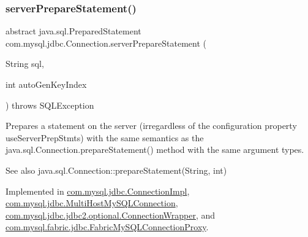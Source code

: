 \subsubsection{\texorpdfstring{server\+Prepare\+Statement()}{serverPrepareStatement()}\hspace{0.1cm}{\footnotesize\ttfamily [2/6]}}
{\footnotesize\ttfamily abstract java.\+sql.\+Prepared\+Statement com.\+mysql.\+jdbc.\+Connection.\+server\+Prepare\+Statement (\begin{DoxyParamCaption}\item[{String}]{sql,  }\item[{int}]{auto\+Gen\+Key\+Index }\end{DoxyParamCaption}) throws S\+Q\+L\+Exception\hspace{0.3cm}{\ttfamily [abstract]}}

Prepares a statement on the server (irregardless of the configuration property \textquotesingle{}use\+Server\+Prep\+Stmts\textquotesingle{}) with the same semantics as the java.\+sql.\+Connection.\+prepare\+Statement() method with the same argument types.

\begin{DoxySeeAlso}{See also}
java.\+sql.\+Connection\+::prepare\+Statement(\+String, int) 
\end{DoxySeeAlso}


Implemented in \mbox{\hyperlink{classcom_1_1mysql_1_1jdbc_1_1_connection_impl_a03fa01b17c7f7166c578fcd596fb9a8a}{com.\+mysql.\+jdbc.\+Connection\+Impl}}, \mbox{\hyperlink{classcom_1_1mysql_1_1jdbc_1_1_multi_host_my_s_q_l_connection_ab243fd44a8b19e2cf489e88a469dcee3}{com.\+mysql.\+jdbc.\+Multi\+Host\+My\+S\+Q\+L\+Connection}}, \mbox{\hyperlink{classcom_1_1mysql_1_1jdbc_1_1jdbc2_1_1optional_1_1_connection_wrapper_a83b5601387fe6a749d66a4c7a18315a4}{com.\+mysql.\+jdbc.\+jdbc2.\+optional.\+Connection\+Wrapper}}, and \mbox{\hyperlink{classcom_1_1mysql_1_1fabric_1_1jdbc_1_1_fabric_my_s_q_l_connection_proxy_a6c9996b3e5be5aaab5f249429275a214}{com.\+mysql.\+fabric.\+jdbc.\+Fabric\+My\+S\+Q\+L\+Connection\+Proxy}}.

\mbox{\label{interfacecom_1_1mysql_1_1jdbc_1_1_connection_acda6552c537e45e1d46a1d8e21beefe3}} 

